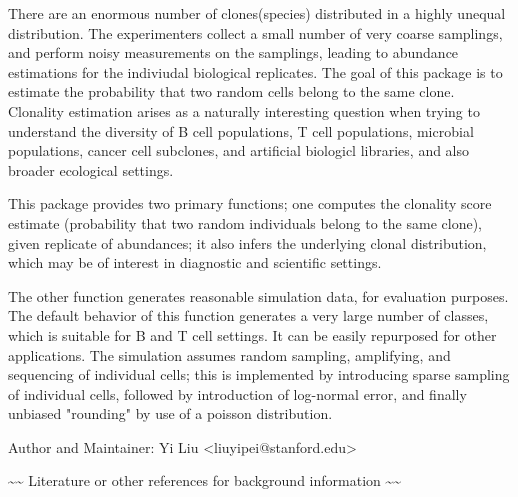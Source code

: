\documentclass[letterpaper]{book}
\begin{document}
\begin{Description}\relax
There are an enormous number of clones(species) distributed in a highly unequal distribution. The experimenters collect a small number of very coarse samplings, and perform noisy measurements on the samplings, leading to abundance estimations for the indiviudal biological replicates. The goal of this package is to estimate the probability that two random cells belong to the same clone. Clonality estimation arises as a naturally interesting question when trying to understand the diversity of B cell populations, T cell populations, microbial populations, cancer cell subclones, and artificial biologicl libraries, and also broader ecological settings.

This package provides two primary functions; one computes the clonality score estimate (probability that two random individuals belong to the same clone), given replicate of abundances; it also infers the underlying clonal distribution, which may be of interest in diagnostic and scientific settings. 

The other function generates reasonable simulation data, for evaluation purposes. The default behavior of this function generates a very large number of classes, which is suitable for B and T cell settings. It can be easily repurposed for other applications. The simulation assumes random sampling, amplifying, and sequencing of individual cells; this is implemented by introducing sparse sampling of individual cells, followed by introduction of log-normal error, and finally unbiased "rounding" by use of a poisson distribution.

\end{Description}
%
\begin{Details}\relax

\end{Details}
%
\begin{Author}\relax
Author and Maintainer: Yi Liu <liuyipei@stanford.edu>
\end{Author}
%
\begin{References}\relax
\textasciitilde{}\textasciitilde{} Literature or other references for background information \textasciitilde{}\textasciitilde{}
\end{References}
\end{document}
